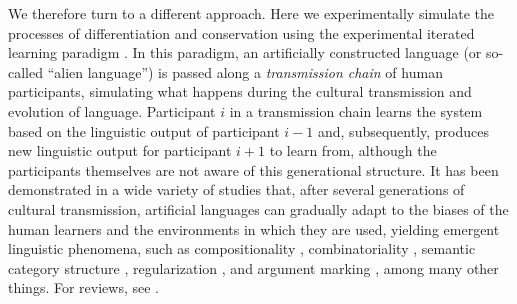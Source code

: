 \documentclass[doc,biblatex]{apa7}
\begin{document}
We therefore turn to a different approach. Here we experimentally simulate the processes of differentiation and conservation using the experimental iterated learning paradigm \parencite{Kirby:2008}. In this paradigm, an artificially constructed language (or so-called ``alien language'') is passed along a \textit{transmission chain} of human participants, simulating what happens during the cultural transmission and evolution of language. Participant $i$ in a transmission chain learns the system based on the linguistic output of participant $i-1$ and, subsequently, produces new linguistic output for participant $i+1$ to learn from, although the participants themselves are not aware of this generational structure. It has been demonstrated in a wide variety of studies that, after several generations of cultural transmission, artificial languages can gradually adapt to the biases of the human learners and the environments in which they are used, yielding emergent linguistic phenomena, such as compositionality \parencite{Beckner:2017, Kirby:2008, Kirby:2015}, combinatoriality \parencite{Verhoef:2015}, semantic category structure \parencite{Carr:2017, Canini:2014, Silvey:2019}, regularization \parencite{Ferdinand:2019, Smith:2010}, and argument marking \parencite{Motamedi:2021}, among many other things. For reviews, see \textcite{Bailes:2023, Kirby:2014, Kirby:2017, Smith:2022, Tamariz:2017}.
\end{document}
